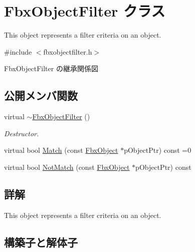 \hypertarget{class_fbx_object_filter}{}\section{Fbx\+Object\+Filter クラス}
\label{class_fbx_object_filter}


This object represents a filter criteria on an object.  




{\ttfamily \#include $<$fbxobjectfilter.\+h$>$}



Fbx\+Object\+Filter の継承関係図
\subsection*{公開メンバ関数}
\begin{DoxyCompactItemize}
\item 
virtual \hyperlink{class_fbx_object_filter_a811d3a582860aaebe5d8008496fc6954}{$\sim$\+Fbx\+Object\+Filter} ()
\begin{DoxyCompactList}\small\item\em Destructor. \end{DoxyCompactList}\item 
virtual bool \hyperlink{class_fbx_object_filter_a49cc7b7c109f98910241d62ec0bd093b}{Match} (const \hyperlink{class_fbx_object}{Fbx\+Object} $\ast$p\+Object\+Ptr) const =0
\item 
virtual bool \hyperlink{class_fbx_object_filter_a1920c73e0044a43ae151175d788e7674}{Not\+Match} (const \hyperlink{class_fbx_object}{Fbx\+Object} $\ast$p\+Object\+Ptr) const
\end{DoxyCompactItemize}


\subsection{詳解}
This object represents a filter criteria on an object. 

\subsection{構築子と解体子}
\mbox{\label{class_fbx_object_filter_a811d3a582860aaebe5d8008496fc6954}} 
